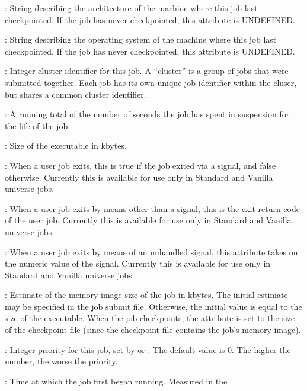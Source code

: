 \begin{description}
%
%
\item[\AdAttr{CkptArch}] : String describing the architecture of the machine
where this job last checkpointed.  If the job has never checkpointed,
this attribute is UNDEFINED.
%
\item[\AdAttr{CkptOpSys}] : String describing the operating system of
the machine where this job last checkpointed.  If the job has never
checkpointed, this attribute is UNDEFINED.
%
\item[\AdAttr{ClusterId}] : Integer cluster identifier for this job.
A ``cluster'' is a group of jobs that were submitted together.  Each
job has its own unique job identifier within the cluser, but shares a
common cluster identifier.
%
\item[\AdAttr{CumulativeSuspensionTime}] : A running total of the number of
seconds the job has spent in suspension for the life of the job.
%
\item[\AdAttr{ExecutableSize}] : Size of the executable in kbytes.
%
\item[\AdAttr{ExitBySignal}] : When a user job exits, this is true if the
job exited via a signal, and false otherwise. Currently this is available for use only in Standard and Vanilla universe jobs.
%
\item[\AdAttr{ExitCode}] : When a user job exits by means other than a signal,
this is the exit return code of the user job. Currently this is available for use only in Standard and Vanilla universe jobs.
%
\item[\AdAttr{ExitSignal}] : When a user job exits by means of an unhandled 
signal, this attribute takes on the numeric value of the signal. Currently this is available for use only in Standard and Vanilla universe jobs.
%
\item[\AdAttr{ImageSize}] : Estimate of the memory image size of the
job in kbytes.  The initial estimate may be specified in the job
submit file.  Otherwise, the initial value is equal to the size of the
executable.  When the job checkpoints, the 
attribute is set to the size of the checkpoint file (since the
checkpoint file contains the job's memory image).
%
\item[\AdAttr{JobPrio}] : Integer priority for this job, set by
 or .  The default value is 0.  The higher
the number, the worse the priority.
%
\item[\AdAttr{JobStartDate}] : Time at which the job first began
running.  Measured in the

\end{description}
